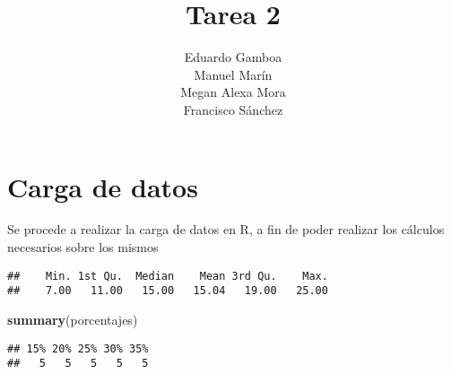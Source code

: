 \documentclass[]{article}
\title{Tarea 2}
\author{Eduardo Gamboa \\ Manuel Marín \\ Megan Alexa Mora \\ Francisco Sánchez}
\date{}
\newenvironment{Shaded}{\begin{snugshade}}{\end{snugshade}}
\newcommand{\KeywordTok}[1]{\textcolor[rgb]{0.13,0.29,0.53}{\textbf{#1}}}
\newcommand{\DataTypeTok}[1]{\textcolor[rgb]{0.13,0.29,0.53}{#1}}
\newcommand{\DecValTok}[1]{\textcolor[rgb]{0.00,0.00,0.81}{#1}}
\newcommand{\StringTok}[1]{\textcolor[rgb]{0.31,0.60,0.02}{#1}}
\newcommand{\NormalTok}[1]{#1}
\begin{document}
\maketitle

\section{Carga de datos}\label{carga-de-datos}

Se procede a realizar la carga de datos en R, a fin de poder realizar
los cálculos necesarios sobre los mismos

\begin{Shaded}
\end{Shaded}

\begin{verbatim}
##    Min. 1st Qu.  Median    Mean 3rd Qu.    Max. 
##    7.00   11.00   15.00   15.04   19.00   25.00
\end{verbatim}

\begin{Shaded}
\begin{Highlighting}[]
\KeywordTok{summary}\NormalTok{(porcentajes)}
\end{Highlighting}
\end{Shaded}

\begin{verbatim}
## 15% 20% 25% 30% 35% 
##   5   5   5   5   5
\end{verbatim}
\end{document}
